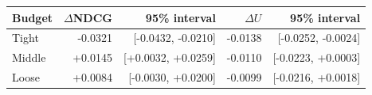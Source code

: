 \begin{tabular}{lrrrr}
\toprule
Budget & $\Delta$NDCG & 95\% interval & $\Delta U$ & 95\% interval \\
\midrule
Tight & -0.0321 & [-0.0432, -0.0210] & -0.0138 & [-0.0252, -0.0024] \\
Middle & +0.0145 & [+0.0032, +0.0259] & -0.0110 & [-0.0223, +0.0003] \\
Loose & +0.0084 & [-0.0030, +0.0200] & -0.0099 & [-0.0216, +0.0018] \\
\bottomrule
\end{tabular}
